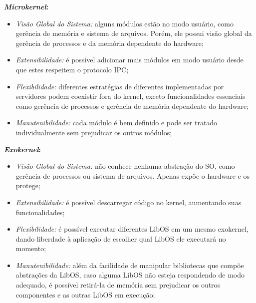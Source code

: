 \begin{exercicio}
  \textbf{\textit{Microkernel}:}
  \begin{itemize}
    \item \textit{Visão Global do Sistema:} alguns módulos estão no modo usuário, como gerência de memória e sistema de arquivos. Porém, ele possui visão global da gerência de processos e da memória dependente do hardware;
    \item \textit{Extensibilidade:} é possível adicionar mais módulos em modo usuário desde que estes respeitem o protocolo IPC;
    \item \textit{Flexibilidade:} diferentes estratégias de diferentes implementadas por servidores podem coexistir fora do kernel, exceto funcionalidades essenciais como gerência de processos e gerência de memória dependente do hardware;
    \item \textit{Manutenibilidade:} cada módulo é bem definido e pode ser tratado individualmente sem prejudicar os outros módulos;
  \end{itemize}

  \textbf{\textit{Exokernel}:}
  \begin{itemize}
    \item \textit{Visão Global do Sistema:} não conhece nenhuma abstração do SO, como gerência de processos ou sistema de arquivos. Apenas expõe o hardware e os protege;
    \item \textit{Extensibilidade:} é possível descarregar código no kernel, aumentando suas funcionalidades;
    \item \textit{Flexibilidade:} é possível executar diferentes LibOS em um mesmo exokernel, dando liberdade à aplicação de escolher qual LibOS ele executará no momento;
    \item \textit{Manutenibilidade:} além da facilidade de manipular bibliotecas que compõe abstrações da LibOS, caso alguma LibOS não esteja respondendo de modo adequado, é possível retirá-la de memória sem prejudicar os outros componentes e as outras LibOS em execução;
  \end{itemize}
\end{exercicio}
